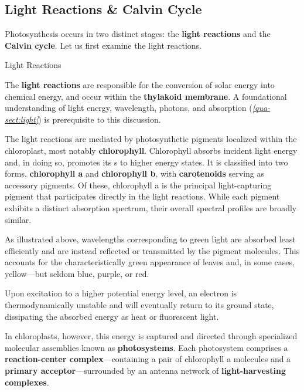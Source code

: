 \documentclass[10pt]{article}
\begin{document}
  \subsection{Light Reactions \& Calvin Cycle}
  
    Photosynthesis occurs in two distinct stages: the \textbf{light reactions} and the \textbf{Calvin cycle}. Let us first examine the light reactions.

    \begin{core}{Light Reactions}

      The \textbf{light reactions} are responsible for the conversion of solar energy into chemical energy, and occur within the \textbf{thylakoid membrane}. A foundational understanding of light energy, wavelength, photons, and absorption (\textit{\autoref{qua-sect:light}}) is prerequisite to this discussion.

      The light reactions are mediated by photosynthetic pigments localized within the chloroplast, most notably \textbf{chlorophyll}. Chlorophyll absorbs incident light energy and, in doing so, promotes its s to higher energy states. It is classified into two forms, \textbf{chlorophyll a} and \textbf{chlorophyll b}, with \textbf{carotenoids} serving as accessory pigments. Of these, chlorophyll a is the principal light-capturing pigment that participates directly in the light reactions. While each pigment exhibits a distinct absorption spectrum, their overall spectral profiles are broadly similar.


      As illustrated above, wavelengths corresponding to green light are absorbed least efficiently and are instead reflected or transmitted by the pigment molecules. This accounts for the characteristically green appearance of leaves and, in some cases, yellow---but seldom blue, purple, or red.

      Upon excitation to a higher potential energy level, an electron is thermodynamically unstable and will eventually return to its ground state, dissipating the absorbed energy as heat or fluorescent light.


      In chloroplasts, however, this energy is captured and directed through specialized molecular assemblies known as \textbf{photosystems}. Each photosystem comprises a \textbf{reaction-center complex}---containing a pair of chlorophyll a molecules and a \textbf{primary  acceptor}---surrounded by an antenna network of \textbf{light-harvesting complexes}.


\end{core}
\end{document}
